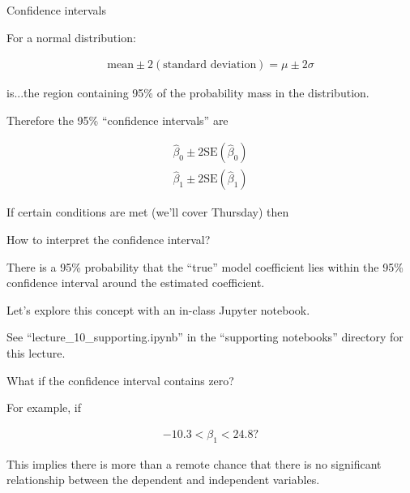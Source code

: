 \documentclass[aspectratio=169]{beamer}
\begin{document}
\begin{frame}{Confidence intervals}

For a normal distribution:

\begin{align*}
\text{mean} \pm 2 (\text{standard deviation}) = \mu \pm 2\sigma
\end{align*}

is...\pause the region containing 95\% of the probability mass in the distribution.  

\vspace{5mm}

Therefore the 95\% ``confidence intervals'' are

\begin{align*}
\hat{\beta}_0 \pm 2\text{SE}(\hat{\beta}_0) \\
\hat{\beta}_1 \pm 2\text{SE}(\hat{\beta}_1) 
\end{align*}

If certain conditions are met (we'll cover Thursday) then
\end{frame}

\begin{frame}{How to interpret the confidence interval?}

\pause

There is a 95\% probability that the ``true'' model coefficient lies within the 95\% confidence interval around the estimated coefficient.  

\vspace{5mm}

Let's explore this concept with an in-class Jupyter notebook.

\vspace{5mm}

  See ``lecture\_10\_supporting.ipynb'' in the ``supporting notebooks'' directory for this lecture.


\end{frame}

\begin{frame}{What if the confidence interval contains zero?}

For example, if 

\begin{align*}
-10.3 < \beta_1 < 24.8?
\end{align*}

This implies there is more than a remote chance that there is no significant relationship between the dependent and independent variables.  

\end{frame}
\end{document}

